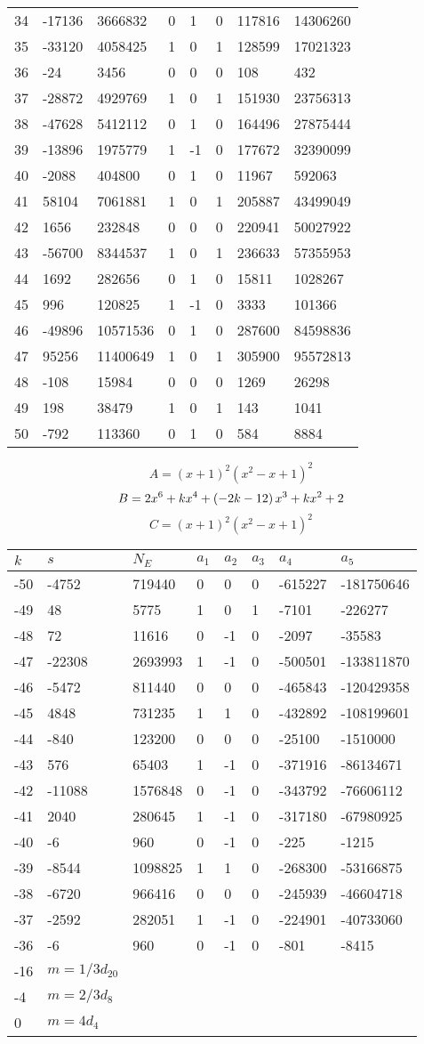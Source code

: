 \documentclass{amsart}
\begin{document}
\begin{longtable}{|l|l|l|lllll|}
34&-17136&3666832&0&1&0&117816&14306260\\
35&-33120&4058425&1&0&1&128599&17021323\\
36&-24&3456&0&0&0&108&432\\
37&-28872&4929769&1&0&1&151930&23756313\\
38&-47628&5412112&0&1&0&164496&27875444\\
39&-13896&1975779&1&-1&0&177672&32390099\\
40&-2088&404800&0&1&0&11967&592063\\
41&58104&7061881&1&0&1&205887&43499049\\
42&1656&232848&0&0&0&220941&50027922\\
43&-56700&8344537&1&0&1&236633&57355953\\
44&1692&282656&0&1&0&15811&1028267\\
45&996&120825&1&-1&0&3333&101366\\
46&-49896&10571536&0&1&0&287600&84598836\\
47&95256&11400649&1&0&1&305900&95572813\\
48&-108&15984&0&0&0&1269&26298\\
49&198&38479&1&0&1&143&1041\\
50&-792&113360&0&1&0&584&8884\\
\hline
\end{longtable}
$$A=(x
 + 1)^{2}(x^2
 - x
 + 1)^{2}$$
$$B=2\*x^6
 + k\*x^4
 + \left(-2\*k
 - 12\right) \*x^3
 + k\*x^2
 + 2$$
$$C=(x
 + 1)^{2}(x^2
 - x
 + 1)^{2}$$
\begin{longtable}{|l|l|l|lllll|}
\hline
$k$ & $s$ & $N_E$ & $a_1$ & $a_2$ & $a_3$ & $a_4$ & $a_5$\\
\hline
-50&-4752&719440&0&0&0&-615227&-181750646\\
-49&48&5775&1&0&1&-7101&-226277\\
-48&72&11616&0&-1&0&-2097&-35583\\
-47&-22308&2693993&1&-1&0&-500501&-133811870\\
-46&-5472&811440&0&0&0&-465843&-120429358\\
-45&4848&731235&1&1&0&-432892&-108199601\\
-44&-840&123200&0&0&0&-25100&-1510000\\
-43&576&65403&1&-1&0&-371916&-86134671\\
-42&-11088&1576848&0&-1&0&-343792&-76606112\\
-41&2040&280645&1&-1&0&-317180&-67980925\\
-40&-6&960&0&-1&0&-225&-1215\\
-39&-8544&1098825&1&1&0&-268300&-53166875\\
-38&-6720&966416&0&0&0&-245939&-46604718\\
-37&-2592&282051&1&-1&0&-224901&-40733060\\
-36&-6&960&0&-1&0&-801&-8415\\
-16&$m=1/3d_{20}$&&\multicolumn{5}{c|}{}\\
-4&$m=2/3d_{8}$&&\multicolumn{5}{c|}{}\\
0&$m=4d_{4}$&&\multicolumn{5}{c|}{}\\
\hline
\end{longtable}
\end{document}
